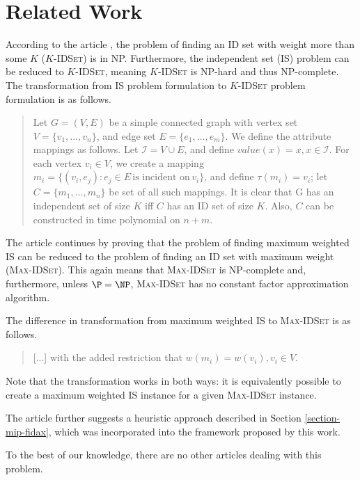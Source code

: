\chapter{Related Work}
\label{chapter-research}

According to the article \cite[Chapter~4]{fidax}, the problem of finding an ID set with weight more than some $K$ ($K$-\textsc{IDSet}) is in NP. Furthermore, the independent set (IS) problem can be reduced to $K$-\textsc{IDSet}, meaning $K$-\textsc{IDSet} is NP-hard and thus NP-complete. The transformation from IS problem formulation to $K$-\textsc{IDSet} problem formulation is as follows.

\begin{quote}
Let $G = (V, E)$ be a simple connected graph with vertex set $V = \{v_1, \ldots, v_n\}$, and edge set $E = \{e_1, \ldots, e_m\}$. We define the attribute mappings as follows. Let $ \mathcal{I} = V \cup E$, and define $value(x) = x, x \in \mathcal{I}$. For each vertex $v_i \in V$, we create a mapping $m_i = \{(v_i, e_j): e_j \in E \,\text{is incident on}\, v_i \}$, and define $\tau(m_i) = v_i$; let $C = \{m_1, \ldots, m_n\}$ be set of all such mappings. It is clear that G has an independent set of size $K$ iff $C$ has an ID set of size $K$. Also, $C$ can be constructed in time polynomial on $n+m$.
\end{quote}

The article continues by proving that the problem of finding maximum weighted IS can be reduced to the problem of finding an ID set with maximum weight (\textsc{Max-IDSet}). This again means that \textsc{Max-IDSet} is NP-complete and, furthermore, unless $\P = \NP$, \textsc{Max-IDSet} has no constant factor approximation algorithm.

The difference in transformation from maximum weighted IS to \textsc{Max-IDSet} is as follows.

\begin{quote}
[...] with the added restriction that $w(m_i) = w(v_i), v_i \in V$.
\end{quote}

Note that the transformation works in both ways: it is equivalently possible to create a maximum weighted IS instance for a given \textsc{Max-IDSet} instance.

The article further suggests a heuristic approach described in Section \ref{section-mip-fidax}, which was incorporated into the framework proposed by this work.

To the best of our knowledge, there are no other articles dealing with this problem.\\

